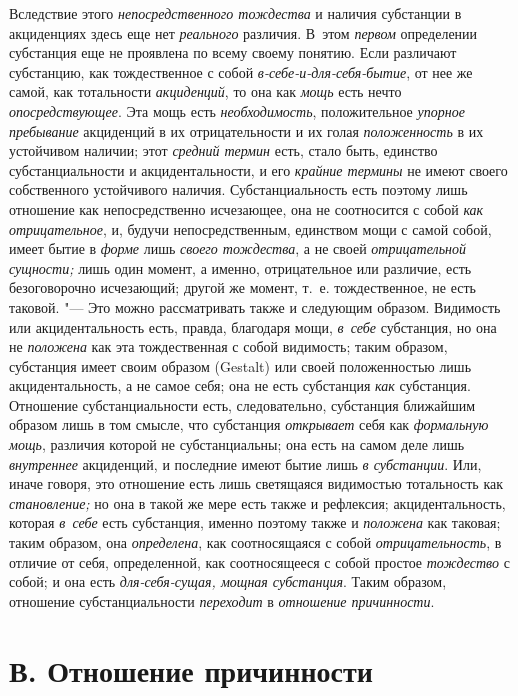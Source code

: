 Вследствие этого {\em непосредственного тождества} и
наличия субстанции в акциденциях здесь еще нет
{\em реального} различия. В~этом
{\em первом} определении субстанция еще не проявлена по
всему своему понятию. Если различают субстанцию, как тождественное с собой
{\em в-себе-и-для-себя-бытие}, от нее же самой, как
тотальности {\em акциденций}, то она как
{\em мощь} есть нечто
{\em опосредствующее}. Эта мощь есть
{\em необходимость}, положительное
{\em упорное пребывание} акциденций в их
отрицательности и их голая {\em положенность} в их
устойчивом наличии; этот {\em средний термин} есть,
стало быть, единство субстанциальности и акцидентальности, и его
{\em крайние термины} не имеют своего собственного
устойчивого наличия. Субстанциальность есть поэтому лишь отношение как
непосредственно исчезающее, она не соотносится с собой
{\em как отрицательное}, и, будучи непосредственным,
единством мощи с самой собой, имеет бытие в {\em форме}
лишь {\em своего тождества}, а не своей
{\em отрицательной сущности;} лишь один момент, а
именно, отрицательное или различие, есть безоговорочно исчезающий; другой
же момент, т.~е. тождественное, не есть таковой. "--- Это можно рассматривать
также и следующим образом. Видимость или акцидентальность есть, правда,
благодаря мощи, {\em в~себе} субстанция, но она не
{\em положена} как эта тождественная с собой видимость;
таким образом, субстанция имеет своим образом (Gestalt) или своей
положенностью лишь акцидентальность, а не самое себя; она не есть
субстанция {\em как} субстанция. Отношение
субстанциальности есть, следовательно, субстанция ближайшим образом лишь в
том смысле, что субстанция {\em открывает} себя как
{\em формальную мощь}, различия которой не
субстанциальны; она есть на самом деле лишь
{\em внутреннее} акциденций, и последние имеют бытие
лишь {\em в субстанции}. Или, иначе говоря, это
отношение есть лишь светящаяся видимостью тотальность как
{\em становление;} но она в такой же мере есть также и
рефлексия; акцидентальность, которая {\em в~себе} есть
субстанция, именно поэтому также и {\em положена} как
таковая; таким образом, она {\em определена}, как
соотносящаяся с собой {\em отрицательность}, в отличие
от себя, определенной, как соотносящееся с собой простое
{\em тождество} с собой; и она есть {\em для-себя-сущая, мощная
субстанция}. Таким образом, отношение субстанциальности
{\em переходит} в {\em отношение причинности}.


\section[В. Отношение причинности]{В. Отношение причинности}

